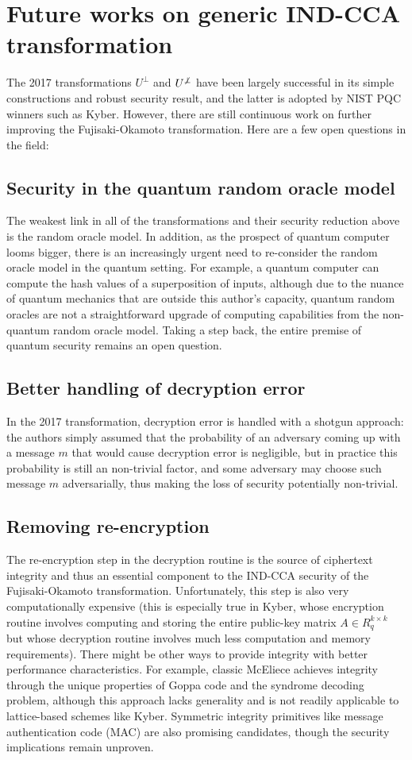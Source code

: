 \documentclass{article}
\begin{document}
\section{Future works on generic IND-CCA transformation}
The 2017 transformations $U^\bot$ and $U^{\not\bot}$ have been largely successful in its simple constructions and robust security result, and the latter is adopted by NIST PQC winners such as Kyber. However, there are still continuous work on further improving the Fujisaki-Okamoto transformation. Here are a few open questions in the field:

\subsection{Security in the quantum random oracle model}
The weakest link in all of the transformations and their security reduction above is the random oracle model. In addition, as the prospect of quantum computer looms bigger, there is an increasingly urgent need to re-consider the random oracle model in the quantum setting. For example, a quantum computer can compute the hash values of a superposition of inputs, although due to the nuance of quantum mechanics that are outside this author's capacity, quantum random oracles are not a straightforward upgrade of computing capabilities from the non-quantum random oracle model. Taking a step back, the entire premise of quantum security remains an open question.

\subsection{Better handling of decryption error}
In the 2017 transformation, decryption error is handled with a shotgun approach: the authors simply assumed that the probability of an adversary coming up with a message $m$ that would cause decryption error is negligible, but in practice this probability is still an non-trivial factor, and some adversary may choose such message $m$ adversarially, thus making the loss of security potentially non-trivial.

\subsection{Removing re-encryption}
The re-encryption step in the decryption routine is the source of ciphertext integrity and thus an essential component to the IND-CCA security of the Fujisaki-Okamoto transformation. Unfortunately, this step is also very computationally expensive (this is especially true in Kyber, whose encryption routine involves computing and storing the entire public-key matrix $A \in R_q^{k \times k}$ but whose decryption routine involves much less computation and memory requirements). There might be other ways to provide integrity with better performance characteristics. For example, classic McEliece achieves integrity through the unique properties of Goppa code and the syndrome decoding problem, although this approach lacks generality and is not readily applicable to lattice-based schemes like Kyber. Symmetric integrity primitives like message authentication code (MAC) are also promising candidates, though the security implications remain unproven.



\end{document}
